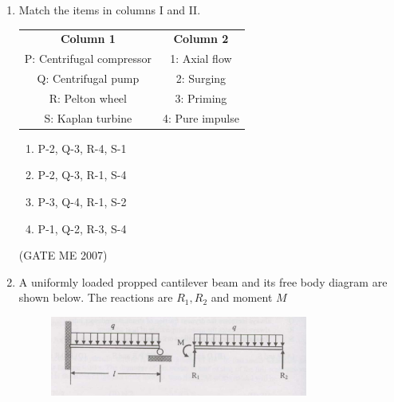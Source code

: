 \documentclass[journal]{IEEEtran}
\begin{document}
\begin{enumerate}
Q: Vorticity is zero at all points in the flow.

R: Velocity is directly proportional to the radius from the centre of the vortex.  

S: Total mechanical energy per unit mass is constant in the entire flow field.

\begin{multicols}{4}
\begin{enumerate}
\item P and Q
\item R and S
\item P and R
\item P and S
\end{enumerate}
\end{multicols}
\hfill (GATE ME 2007)

\item Match the items in columns I and II. 

\begin{tabular}{cc}
\textbf{Column 1}         & \textbf{Column 2}\\
P: Centrifugal compressor & 1: Axial flow \\
Q: Centrifugal pump       & 2: Surging \\ 
R: Pelton wheel           & 3: Priming \\  
S: Kaplan turbine         & 4: Pure impulse \\ 
\end{tabular}

\begin{multicols}{2}
\begin{enumerate}
\item P-2, Q-3, R-4, S-1
\item P-2, Q-3, R-1, S-4
\item P-3, Q-4, R-1, S-2
\item P-1, Q-2, R-3, S-4
\end{enumerate}
\end{multicols}
\hfill (GATE ME 2007)

\item A uniformly loaded propped cantilever beam and its free body diagram are shown below. The reactions are  
\( R_1, R_2 \) and moment \( M \)

\begin{figure}[H]
    \centering
    \includegraphics[width=0.8\textwidth]{Fig 2.png}
    \caption{}
    \label{fig:question42}
\end{figure}


\end{enumerate}
\end{document}
